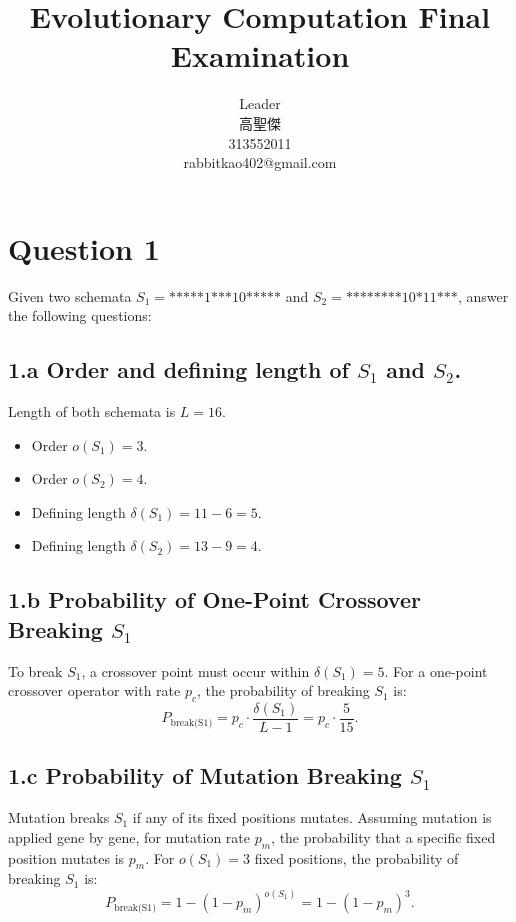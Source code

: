 \documentclass[12pt,letterpaper]{article}
\begin{document}
\begin{CJK}{UTF8}{bkai}
    \title{Evolutionary Computation Final Examination}
    
    \author{
        Leader\\
        高聖傑\\
        313552011\\
        rabbitkao402@gmail.com
    }

    \maketitle
\end{CJK}

\section*{Question 1}
Given two schemata \( S_1 = \text{*****1***10*****} \) and \( S_2 = \text{********10*11***} \), answer the following questions:
\subsection*{1.a Order and defining length of \( S_1 \) and \( S_2 \).}
Length of both schemata is \( L = 16 \).
\begin{itemize}
    \item Order \( o(S_1) = 3 \).
    \item Order \( o(S_2) = 4 \).
    \item Defining length \( \delta(S_1) = 11 - 6 = 5 \).
    \item Defining length \( \delta(S_2) = 13 - 9 = 4 \).
\end{itemize}

\subsection*{1.b Probability of One-Point Crossover Breaking \( S_1 \)}
To break \( S_1 \), a crossover point must occur within \( \delta(S_1) = 5 \).
For a one-point crossover operator with rate \( p_c \), the probability of breaking \( S_1 \) is:
\[
P_{\text{break(S1)}} = p_c \cdot \frac{\delta(S_1)}{L - 1} = p_c \cdot \frac{5}{15}.
\]

\subsection*{1.c Probability of Mutation Breaking \( S_1 \)}
Mutation breaks \( S_1 \) if any of its fixed positions mutates.
Assuming mutation is applied gene by gene, for mutation rate \( p_m \), the probability that a specific fixed position mutates is \( p_m \).
For \( o(S_1) = 3 \) fixed positions, the probability of breaking \( S_1 \) is:
  \[
  P_{\text{break(S1)}} = 1 - (1 - p_m)^{o(S_1)} = 1 - (1 - p_m)^3.
  \]
\end{document}
